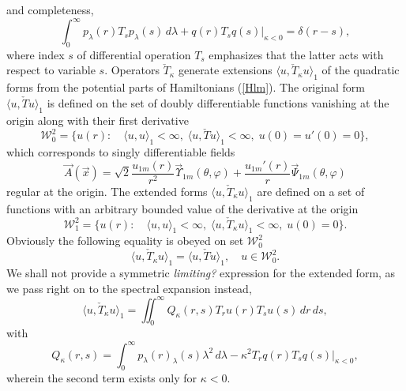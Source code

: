 \documentclass[12pt]{article}
\newcommand{\WW}{\mathscr{W}}
\begin{document}
	and completeness,
\begin{equation*}
    \int_{0}^{\infty} p_{\lambda}(r) T_{s} p_{\lambda}(s) \,d\lambda
        + q(r) T_{s} q(s)\bigr|_{\kappa < 0} = \delta(r-s) ,
\end{equation*}
	where index
$ s $
	of differential operation
$ T_{s} $
	emphasizes that the latter acts with respect to variable
$ s $.
	Operators
$ \check{T}_{\kappa} $
	generate extensions
$ \langle u, \check{T}_{\kappa} u\rangle_{1} $
	of the quadratic forms from the potential parts of Hamiltonians
(\ref{Hlm}).
	The original form
$ \langle u, \check{T} u\rangle_{1} $
	is defined on the set of doubly differentiable functions
	vanishing at the origin along with their first derivative
\begin{equation*}
    \WW^{2}_{0} = \{u(r):\quad \langle u,u\rangle_{1} <\infty, \;
	\langle u, \check{T}u\rangle_{1} < \infty, \; u(0)=u'(0) =0 \} ,
\end{equation*}
	which corresponds to singly differentiable fields
\begin{equation}
\label{Atrns}
    \vec{A}(\vec{x}) =
        \sqrt{2}
	    \frac{u_{1m}(r)}{r^{2}} \vec{\Upsilon}_{1m}(\theta,\varphi) +
        \frac{u_{1m}'(r)}{r} \vec{\Psi}_{1m}(\theta,\varphi)
\end{equation}
	regular at the origin.
	The extended forms
$ \langle u, \check{T}_{\kappa} u\rangle_{1} $
	are defined on a set of functions with an arbitrary bounded value
	of the derivative at the origin
\begin{equation*}
    \WW^{2}_{1} = \{u(r):\quad \langle u,u\rangle_{1} <\infty, \;
	\langle u, \check{T}_{\kappa}u\rangle_{1} < \infty, \; u(0)=0 \} .
\end{equation*}
	Obviously the following equality is obeyed on set
$ \WW^{2}_{0} $
\begin{equation*}
    \langle u, \check{T}_{\kappa} u\rangle_{1}= \langle u,
	\check{T} u\rangle_{1} ,\quad u \in \WW^{2}_{0} .
\end{equation*}
	We shall not provide a symmetric {\it limiting?} expression for the extended
	form, as we pass right on to the spectral expansion instead,
\begin{equation*}
    \langle u, \check{T}_{\kappa} u\rangle_{1}
    = \iint_{0}^{\infty} Q_{\kappa}(r,s) T_{r}u(r) T_{s}u(s) \,dr\,ds ,
\end{equation*}
	with
\begin{equation*}
    Q_{\kappa}(r,s) = \int_{0}^{\infty} p_{\lambda}(r)
    	_{\lambda}(s) \lambda^{2} \,d\lambda
        - \kappa^{2} T_{r} q(r) T_{s} q(s) \bigr|_{\kappa <0} ,
\end{equation*}
	wherein the second term exists only for
$ \kappa < 0 $.
\end{document}
